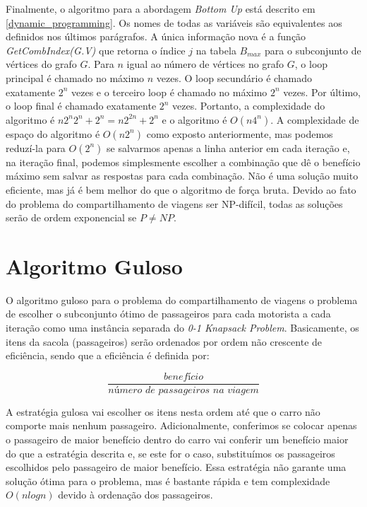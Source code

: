 \documentclass{article}
\begin{document}
Finalmente, o algoritmo para a abordagem \textit{Bottom Up} está descrito em \ref{dynamic_programming}. Os
nomes de todas as variáveis são equivalentes aos definidos nos últimos parágrafos. A única informação nova é a 
função \textit{GetCombIndex(G.V)} que retorna o índice $ j $ na tabela $ B_{max} $ para o subconjunto de vértices do grafo $ G $.
Para $ n $ igual ao número de vértices no grafo $ G $, o loop principal é chamado no máximo $ n $ vezes. O loop secundário é chamado 
exatamente $ 2^n $ vezes e o terceiro loop é chamado no máximo $ 2^n $ vezes. Por último, o loop final é chamado exatamente $ 2^n $
vezes. Portanto, a complexidade do algoritmo é $ n2^n2^n + 2^n = n2^{2n} + 2^n $ e o algoritmo é $ O(n4^n) $. A complexidade de espaço
do algoritmo é $ O(n2^n) $ como exposto anteriormente, mas podemos reduzí-la para $ O(2^n) $ se salvarmos apenas a linha anterior
em cada iteração e, na iteração final, podemos simplesmente escolher a combinação que dê o benefício máximo sem salvar
as respostas para cada combinação. Não é uma solução muito eficiente, mas já é bem melhor do que o algoritmo de força bruta. Devido 
ao fato do problema do compartilhamento de viagens ser NP-difícil, todas as soluções serão de ordem exponencial se $ P \neq NP $.

\section{Algoritmo Guloso}

O algoritmo guloso para o problema do compartilhamento de viagens o problema de escolher o subconjunto ótimo de passageiros para
cada motorista a cada iteração como uma instância separada do \textit{0-1 Knapsack Problem}. Basicamente, os itens da sacola (passageiros) 
serão ordenados por ordem não crescente de eficiência, sendo que a eficiência é definida por:

\[ 
\frac{\textit{benefício}}{\textit{número de passageiros na viagem}}
\]

A estratégia gulosa vai escolher os itens nesta ordem até que o carro não comporte mais nenhum passageiro. Adicionalmente,
conferimos se colocar apenas o passageiro de maior benefício dentro do carro vai conferir um benefício maior do que a estratégia
descrita e, se este for o caso, substituímos os passageiros escolhidos pelo passageiro de maior benefício. Essa estratégia não
garante uma solução ótima para o problema, mas é bastante rápida e tem complexidade $ O(nlogn) $ devido à ordenação dos passageiros.
\end{document}

